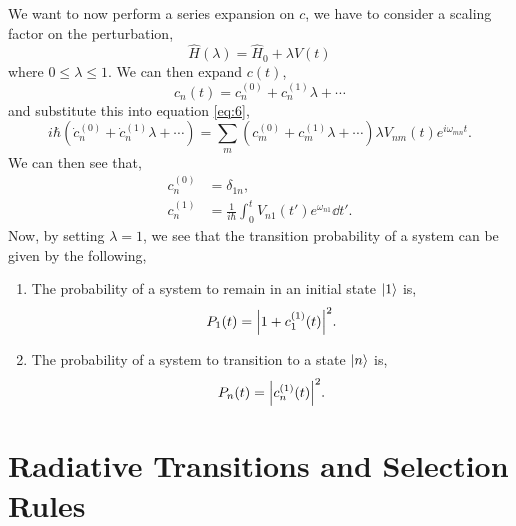 \documentclass{book}
\begin{document}
We want to now perform a series expansion on $c$, we have to consider a scaling factor on the perturbation,
\begin{equation}
	\hat{H}(\lambda) = \hat{H}_0 + \lambda\hat{V}(t)
\end{equation}
where $0\leq\lambda\leq1$. We can then expand $c(t)$,
\begin{equation}
	c_n(t) = c_n^{(0)} + c_n^{(1)}\lambda + \cdots
\end{equation}
and substitute this into equation \eqref{eq:6},
\begin{equation}
	i\hbar(\dot{c}_n^{(0)} + \dot{c}_n^{(1)}\lambda + \cdots)=\sum_m (c_m^{(0)} + c_m^{(1)}\lambda + \cdots)\lambda V_{nm}(t)e^{i\omega_{mn}t}.
\end{equation}
We can then see that,
\begin{align}
	c_n^{(0)} &= \delta_{1n}, \\
	c_n^{(1)} &= \frac{1}{i\hbar}\int_0^tV_{n1}(t')e^{\omega_{n1}}\dd{t'}.
\end{align}
Now, by setting $\lambda =1$, we see that the transition probability of a system can be given by the following,
\begin{enumerate}
	\item The probability of a system to remain in an initial state $\ket{1}$ is,
	\begin{equation}
		P_1(t) = \abs{1 + c_1^{(1)}(t)}^2.
	\end{equation}
	\item The probability of a system to transition to a state $\ket{n}$ is,
	\begin{equation}
		P_n(t) = \abs{c_n^{(1)}(t)}^2.
	\end{equation}
\end{enumerate} 
\section{Radiative Transitions and Selection Rules}
\end{document}
